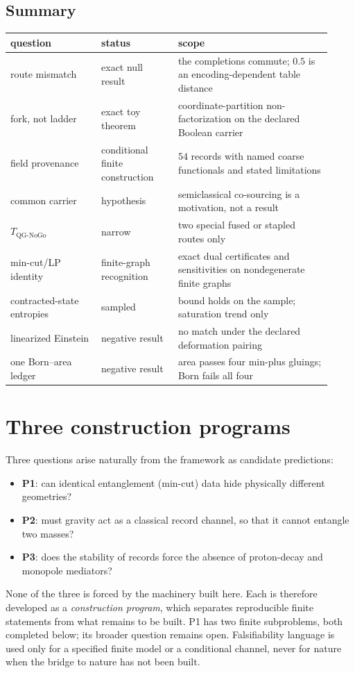 \documentclass[11pt]{article}
\theoremstyle{definition}
\providecommand{\tightlist}{\setlength{\itemsep}{0pt}\setlength{\parskip}{0pt}}
\begin{document}
\subsection{Summary}\label{result-qmgr-summary-table}

\begin{center}
\small
\begin{longtable}[]{@{}p{0.26\linewidth}p{0.22\linewidth}p{0.44\linewidth}@{}}
\toprule
question & status & scope\\
\midrule
\endhead
route mismatch & exact null result & the completions commute; \(0.5\) is an encoding-dependent table distance\\
fork, not ladder & exact toy theorem & coordinate-partition non-factorization on the declared Boolean carrier\\
field provenance & conditional finite construction & \(54\) records with named coarse functionals and stated
limitations\\
common carrier & hypothesis & semiclassical co-sourcing is a motivation, not a result\\
\(T_{\mathrm{QG\text{-}NoGo}}\) & narrow & two special fused or stapled routes only\\
min-cut/LP identity & finite-graph recognition & exact dual certificates and sensitivities on nondegenerate finite
graphs\\
contracted-state entropies & sampled & bound holds on the sample; saturation trend only\\
linearized Einstein & negative result & no match under the declared deformation pairing\\
one Born--area ledger & negative result & area passes four min-plus gluings; Born fails all four\\
\bottomrule
\end{longtable}
\end{center}
 \section{Three construction programs}\label{open-programs-from-the-three-published-predictions}

Three questions arise naturally from the framework as candidate predictions:
\begin{itemize}\tightlist
\item \textbf{P1}: can identical entanglement (min-cut) data hide physically different geometries?
\item \textbf{P2}: must gravity act as a classical record channel, so that it cannot entangle two masses?
\item \textbf{P3}: does the stability of records force the absence of proton-decay and monopole mediators?
\end{itemize}
None of the three is forced by the machinery built here. Each is therefore developed as a \emph{construction
program}, which separates reproducible finite statements from what remains to be built. P1 has two finite subproblems,
both completed below; its broader question remains open. Falsifiability language is used only for a specified finite
model or a conditional channel, never for nature when the bridge to nature has not been built.
\end{document}
